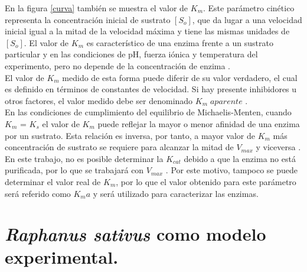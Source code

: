 En la figura \ref{curva} también se muestra el valor de $K_m$. Este par\'ametro cin\'etico representa la concentración inicial de sustrato $[S_o]$, que da lugar a una velocidad inicial igual a la mitad de la velocidad máxima y tiene las mismas unidades de $[S_o]$. El valor de $K_m$ es característico de una enzima frente a un sustrato particular y en las condiciones de pH, fuerza iónica y temperatura del experimento, pero no depende de la concentración de enzima \citep{chavez1990temas}.\\

El valor de $K_m$ medido de esta forma puede diferir de su valor verdadero, el cual es definido en términos de constantes de velocidad. Si hay presente inhibidores u otros factores, el valor medido debe ser denominado $K_m \; aparente$ \citep{chavez1990temas}. \\

En las condiciones de cumplimiento del equilibrio de Michaelis-Menten, cuando $K_m$ = $K_s$ el valor de $K_m$ puede reflejar la mayor o menor afinidad de una enzima por un sustrato. Esta relación es inversa, por tanto, a mayor valor de $K_m$ más concentración de sustrato se requiere para alcanzar la mitad de $V_{max}$ y viceversa \citep{chavez1990temas}.\\



En este trabajo, no es posible determinar la $K_{cat}$ debido a que la enzima no est\'a purificada, por lo que se trabajar\'a con $V_{max}$ . Por este motivo, tampoco se puede determinar el valor real de $K_m$, por lo que el valor obtenido para este par\'ametro ser\'a referido como $K_ma$ y ser\'a utilizado para caracterizar las enzimas. \\

%


\section{\textit{Raphanus sativus} como modelo experimental.}

